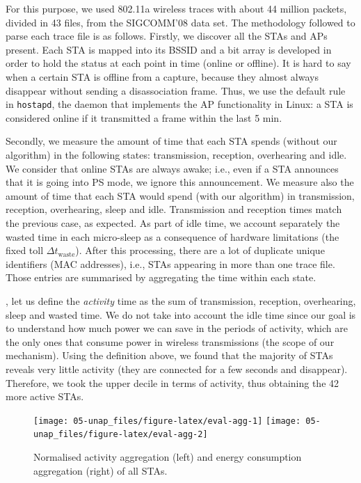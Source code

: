 \documentclass[twoside,nohyper]{tufte-book}
\theoremstyle{definition}
\theoremstyle{definition}
\theoremstyle{definition}
\theoremstyle{remark}
\begin{document}
For this purpose, we used 802.11a wireless traces with about 44 million
packets, divided in 43 files, from the SIGCOMM'08 data
set\cite[0pt]{umd-sigcomm2008-2009-03-02}.
The methodology followed to parse each trace file is as follows.
Firstly, we discover all the STAs and APs present. Each STA is mapped
into its BSSID and a bit array is developed in order to hold the status
at each point in time (online or offline). It is hard to say when a
certain STA is offline from a capture, because they almost always
disappear without sending a disassociation frame. Thus, we use the
default rule in \texttt{hostapd}, the daemon that implements the AP
functionality in Linux: a STA is considered online if it transmitted a
frame within the last 5 min.

Secondly, we measure the amount of time that each STA spends (without
our algorithm) in the following states: transmission, reception,
overhearing and idle. We consider that online STAs are always awake;
i.e., even if a STA announces that it is going into PS mode, we ignore
this announcement. We measure also the amount of time that each STA
would spend (with our algorithm) in transmission, reception,
overhearing, sleep and idle. Transmission and reception times match the
previous case, as expected. As part of idle time, we account separately
the wasted time in each micro-sleep as a consequence of hardware
limitations (the fixed toll \(\Delta t_\mathrm{waste}\)). After this
processing, there are a lot of duplicate unique identifiers (MAC
addresses), i.e., STAs appearing in more than one trace file. Those
entries are summarised by aggregating the time within each state.

, let us define the \emph{activity} time as
the sum of transmission, reception, overhearing, sleep and wasted time.
We do not take into account the idle time since our goal is to
understand how much power we can save in the periods of activity, which
are the only ones that consume power in wireless transmissions (the
scope of our mechanism). Using the definition above, we found that the
majority of STAs reveals very little activity (they are connected for a
few seconds and disappear). Therefore, we took the upper decile in terms
of activity, thus obtaining the 42 more active STAs.




\begin{figure}

{\centering \texttt{[image: 05-unap\_files/figure-latex/eval-agg-1]} \texttt{[image: 05-unap\_files/figure-latex/eval-agg-2]} 

}

\caption[Normalised activity aggregation (left) and energy
consumption aggregation (right) of all STAs.]{Normalised activity aggregation (left) and energy
consumption aggregation (right) of all STAs.}\label{fig:eval-agg}
\end{figure}
\end{document}

